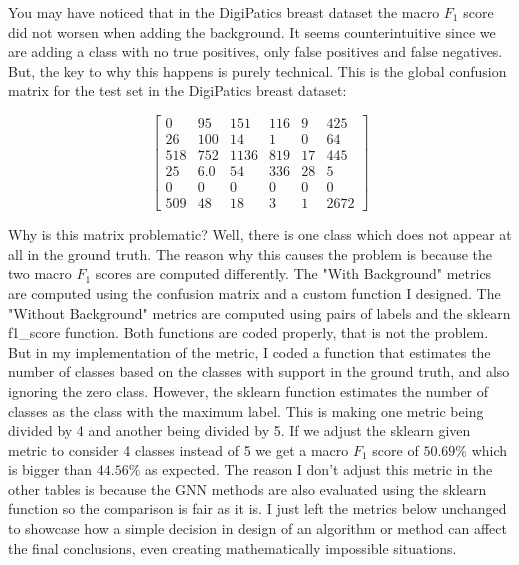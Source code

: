 You may have noticed that in the DigiPatics breast dataset the macro $F_1$ score did not worsen when adding the background. It seems counterintuitive since we are adding a class with no true positives, only false positives and false negatives. But, the key to why this happens is purely technical. This is the global confusion matrix for the test set in the DigiPatics breast dataset:

\[
\begin{bmatrix}
0 & 95 & 151 & 116 & 9 & 425 \\
26 & 100 & 14 & 1 & 0 & 64 \\
518 & 752 & 1136 & 819 & 17 & 445 \\
25 & 6.0 & 54 & 336 & 28 & 5 \\
0 & 0 & 0 & 0 & 0 & 0 \\
509 & 48 & 18 & 3 & 1 & 2672
\end{bmatrix}
\]

\noindent Why is this matrix problematic? Well, there is one class which does not appear at all in the ground truth. The reason why this causes the problem is because the two macro $F_1$ scores are computed differently. The "With Background" metrics are computed using the confusion matrix and a custom function I designed. The "Without Background" metrics are computed using pairs of labels and the sklearn f1\_score function. Both functions are coded properly, that is not the problem. But in my implementation of the metric, I coded a function that estimates the number of classes based on the classes with support in the ground truth, and also ignoring the zero class. However, the sklearn function estimates the number of classes as the class with the maximum label. This is making one metric being divided by 4 and another being divided by 5. If we adjust the sklearn given metric to consider 4 classes instead of 5 we get a macro $F_1$ score of $50.69\%$ which is bigger than $44.56\%$ as expected. The reason I don't adjust this metric in the other tables is because the GNN methods are also evaluated using the sklearn function so the comparison is fair as it is. I just left the metrics below unchanged to showcase how a simple decision in design of an algorithm or method can affect the final conclusions, even creating mathematically impossible situations.

